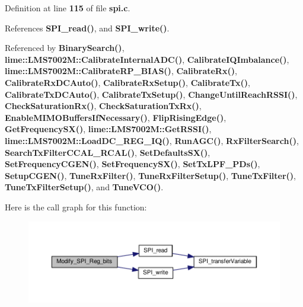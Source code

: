 Definition at line {\bf 115} of file {\bf spi.\+c}.



References {\bf S\+P\+I\+\_\+read()}, and {\bf S\+P\+I\+\_\+write()}.



Referenced by {\bf Binary\+Search()}, {\bf lime\+::\+L\+M\+S7002\+M\+::\+Calibrate\+Internal\+A\+D\+C()}, {\bf Calibrate\+I\+Q\+Imbalance()}, {\bf lime\+::\+L\+M\+S7002\+M\+::\+Calibrate\+R\+P\+\_\+\+B\+I\+A\+S()}, {\bf Calibrate\+Rx()}, {\bf Calibrate\+Rx\+D\+C\+Auto()}, {\bf Calibrate\+Rx\+Setup()}, {\bf Calibrate\+Tx()}, {\bf Calibrate\+Tx\+D\+C\+Auto()}, {\bf Calibrate\+Tx\+Setup()}, {\bf Change\+Until\+Reach\+R\+S\+S\+I()}, {\bf Check\+Saturation\+Rx()}, {\bf Check\+Saturation\+Tx\+Rx()}, {\bf Enable\+M\+I\+M\+O\+Buffers\+If\+Necessary()}, {\bf Flip\+Rising\+Edge()}, {\bf Get\+Frequency\+S\+X()}, {\bf lime\+::\+L\+M\+S7002\+M\+::\+Get\+R\+S\+S\+I()}, {\bf lime\+::\+L\+M\+S7002\+M\+::\+Load\+D\+C\+\_\+\+R\+E\+G\+\_\+\+I\+Q()}, {\bf Run\+A\+G\+C()}, {\bf Rx\+Filter\+Search()}, {\bf Search\+Tx\+Filter\+C\+C\+A\+L\+\_\+\+R\+C\+A\+L()}, {\bf Set\+Defaults\+S\+X()}, {\bf Set\+Frequency\+C\+G\+E\+N()}, {\bf Set\+Frequency\+S\+X()}, {\bf Set\+Tx\+L\+P\+F\+\_\+\+P\+Ds()}, {\bf Setup\+C\+G\+E\+N()}, {\bf Tune\+Rx\+Filter()}, {\bf Tune\+Rx\+Filter\+Setup()}, {\bf Tune\+Tx\+Filter()}, {\bf Tune\+Tx\+Filter\+Setup()}, and {\bf Tune\+V\+C\+O()}.



Here is the call graph for this function\+:
\nopagebreak
\begin{figure}[H]
\begin{center}
\leavevmode
\includegraphics[width=350pt]{da/d00/spi_8c_aaf76507507e6a960fa0c8cb26585095d_cgraph}
\end{center}
\end{figure}




